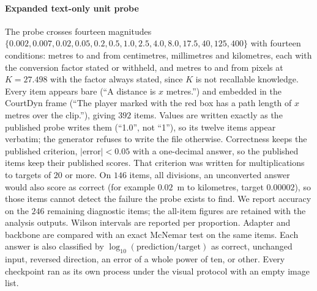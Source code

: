 \documentclass[11pt]{article}
\begin{document}
\paragraph{Expanded text-only unit probe}
\label{app:unit_probe}
The probe crosses fourteen magnitudes
$\{0.002,\allowbreak 0.007,\allowbreak 0.02,\allowbreak 0.05,\allowbreak 0.2,\allowbreak 0.5,\allowbreak 1.0,\allowbreak 2.5,\allowbreak 4.0,\allowbreak 8.0,\allowbreak 17.5,\allowbreak 40,\allowbreak 125,\allowbreak 400\}$
with fourteen conditions: metres to and from centimetres, millimetres and
kilometres, each with the conversion factor stated or withheld, and metres to
and from pixels at $K=27.498$ with the factor always stated, since $K$ is not
recallable knowledge. Every item appears bare (``A distance is $x$ metres.'')
and embedded in the CourtDyn frame (``The player marked with the red box has a
path length of $x$ metres over the clip.''), giving $392$ items. Values are
written exactly as the published probe writes them (``1.0'', not ``1''), so
its twelve items appear verbatim; the generator refuses to write the file
otherwise. Correctness keeps the published criterion, $|\mathrm{error}|<0.05$
with a one-decimal answer, so the published items keep their published scores.
That criterion was written for multiplications to targets of $20$ or more.
On $146$ items, all divisions, an unconverted answer would also score as
correct (for example $0.02$~m to kilometres, target $0.00002$), so those items
cannot detect the failure the probe exists to find. We report accuracy on the
$246$ remaining diagnostic items; the all-item figures are retained with the
analysis outputs. Wilson intervals are reported per proportion. Adapter and
backbone are compared with an exact McNemar test on the same items. Each
answer is also classified by $\log_{10}(\text{prediction}/\text{target})$ as
correct, unchanged input, reversed direction, an error of a whole power of
ten, or other. Every checkpoint ran as its own process under the visual
protocol with an empty image list.
\end{document}
